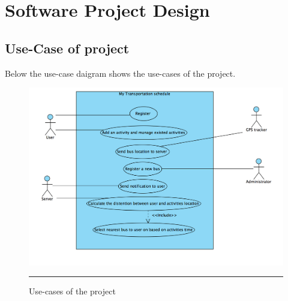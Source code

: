 \chapter{Software Project Design} 

\label{Chapter6} 


\doublespacing


\section{Use-Case of project}

Below the use-case daigram shows the use-cases of the project.
\begin{figure}[H]
	\centering
	\includegraphics[scale=0.5]{Figures/FigureUseCase.png}
	\rule{35em}{0.5pt}
	\caption[Use-cases of the project]{Use-cases of the project}
\end{figure}

